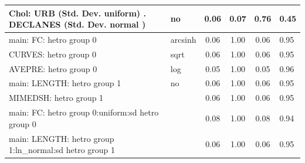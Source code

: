 \begin{table}
\begin{center}
\begin{tabular}{|l|l|c|c|c|l|}
			\hline
			 Chol: URB (Std. Dev. uniform) . DECLANES (Std. Dev.   normal ) & no & 0.06 & 0.07 & 0.76 & 0.45 \\
			\hline
			main: FC: hetro group 0 & arcsinh & 0.06 & 1.00 & 0.06 & 0.95 \\
			\hline
			CURVES: hetro group 0 & sqrt & 0.06 & 1.00 & 0.06 & 0.95 \\
			\hline
			AVEPRE: hetro group 0 & log & 0.05 & 1.00 & 0.05 & 0.96 \\
			\hline
			main: LENGTH: hetro group 1 & no & 0.06 & 1.00 & 0.06 & 0.95 \\
			\hline
			MIMEDSH: hetro group 1 &  & 0.06 & 1.00 & 0.06 & 0.95 \\
			\hline
			main: FC: hetro group 0:uniform:sd  hetro group 0 &  & 0.08 & 1.00 & 0.08 & 0.94 \\
			\hline
			main: LENGTH: hetro group 1:ln_normal:sd  hetro group 1 &  & 0.06 & 1.00 & 0.06 & 0.95 \\
			\hline
		\end{tabular}
	\end{center}
\end{table}